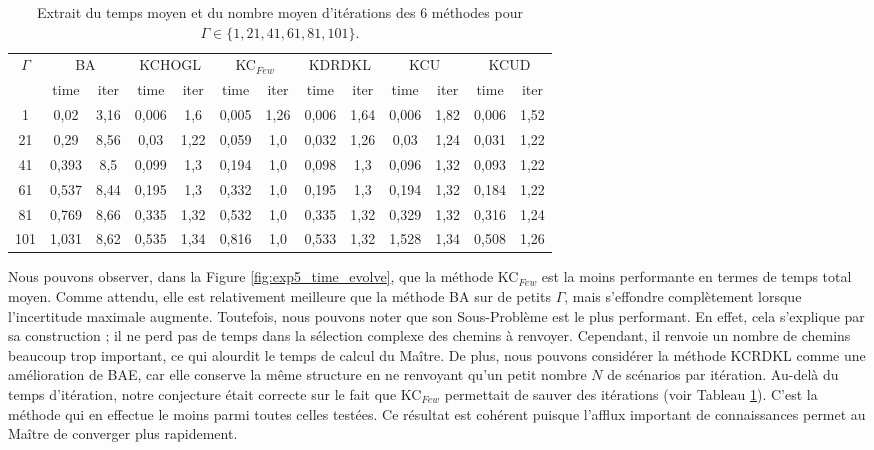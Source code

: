 \documentclass[11pt,a4paper]{article}
\begin{document}
\begin{table}
    \centering
    \begin{tabular}{c|cc|cc|cc|cc|cc|cc}%
        \toprule
        \multicolumn{1}{c|}{\multirow{2}{*}{$\Gamma$}} & \multicolumn{2}{c}{BA} & \multicolumn{2}{c}{KCHOGL} & \multicolumn{2}{c}{KC$_{Few}$} & \multicolumn{2}{c}{KDRDKL} & \multicolumn{2}{c}{KCU} & \multicolumn{2}{c}{KCUD}\\
                & time  & \multicolumn{1}{c}{iter} & time  & \multicolumn{1}{c}{iter} & time  & \multicolumn{1}{c}{iter} & time  & \multicolumn{1}{c}{iter} & time  & \multicolumn{1}{c}{iter} & time  & \multicolumn{1}{c}{iter}\\
        \midrule
            1   & 0,02  & 3,16 & 0,006 & 1,6  & 0,005 & 1,26 & 0,006 & 1,64 & 0,006 & 1,82 & 0,006 & 1,52\\
            21  & 0,29  & 8,56 & 0,03  & 1,22 & 0,059 & 1,0  & 0,032 & 1,26 & 0,03  & 1,24 & 0,031 & 1,22\\
            41  & 0,393 & 8,5  & 0,099 & 1,3  & 0,194 & 1,0  & 0,098 & 1,3  & 0,096 & 1,32 & 0,093 & 1,22\\
            61  & 0,537 & 8,44 & 0,195 & 1,3  & 0,332 & 1,0  & 0,195 & 1,3  & 0,194 & 1,32 & 0,184 & 1,22\\
            81  & 0,769 & 8,66 & 0,335 & 1,32 & 0,532 & 1,0  & 0,335 & 1,32 & 0,329 & 1,32 & 0,316 & 1,24\\
            101 & 1,031 & 8,62 & 0,535 & 1,34 & 0,816 & 1,0  & 0,533 & 1,32 & 1,528 & 1,34 & 0,508 & 1,26\\
        \bottomrule
    \end{tabular}
    \caption{Extrait du temps moyen et du nombre moyen d'itérations des 6 méthodes pour $\Gamma\in\{1, 21, 41, 61, 81, 101\}$.}
    \label{tb:exp4_recap_global}
\end{table}

Nous pouvons observer, dans la Figure \ref{fig:exp5_time_evolve}, que la méthode KC$_{Few}$ est la moins performante en termes de temps total moyen. Comme attendu, elle est relativement meilleure que la méthode BA sur de petits $\Gamma$, mais s'effondre complètement lorsque l'incertitude maximale augmente. Toutefois, nous pouvons noter que son Sous-Problème est le plus performant. En effet, cela s'explique par sa construction ; il ne perd pas de temps dans la sélection complexe des chemins à renvoyer. Cependant, il renvoie un nombre de chemins beaucoup trop important, ce qui alourdit le temps de calcul du Maître. De plus, nous pouvons considérer la méthode KCRDKL comme une amélioration de BAE, car elle conserve la même structure en ne renvoyant qu'un petit nombre $N$ de scénarios par itération. Au-delà du temps d'itération, notre conjecture était correcte sur le fait que KC$_{Few}$ permettait de sauver des itérations (voir Tableau \ref{tb:exp4_recap_global}). C'est la méthode qui en effectue le moins parmi toutes celles testées. Ce résultat est cohérent puisque l'afflux important de connaissances permet au Maître de converger plus rapidement.
\end{document}
